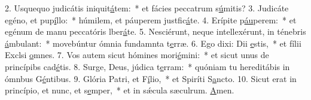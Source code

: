 2. Usquequo judicátis iniquit\uline{á}tem:~* et fácies peccatrum s\uline{ú}mitis?
3. Judicáte egéno, et pup\uline{í}llo:~* húmilem, et páuperem justfic\uline{á}te.
4. Erípite p\uline{áu}perem:~* et egénum de manu peccatóris lber\uline{á}te.
5. Nesciérunt, neque intellexérunt, in ténebris \uline{á}mbulant:~* movebúntur ómnia fundamnta t\uline{e}rræ.
6. Ego dixi: Dii \uline{e}stis,~* et fílii Exclsi \uline{o}mnes.
7. Vos autem sicut hómines mori\uline{é}mini:~* et sicut unus de princípibs cad\uline{é}tis.
8. Surge, Deus, júdica t\uline{e}rram:~* quóniam tu hereditábis in ómnbus G\uline{é}ntibus.
9. Glória Patri, et F\uline{í}lio,~* et Spiríti S\uline{a}ncto.
10. Sicut erat in princípio, et nunc, et s\uline{e}mper,~* et in sǽcula sæculrum. \uline{A}men.
